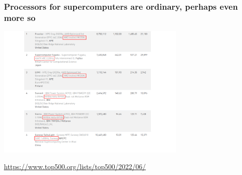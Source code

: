 \documentclass[12pt,dvipdfmx]{beamer}
\begin{document}
\begin{frame}
\frametitle{Processors for supercomputers are ordinary, perhaps even more so}
  \begin{center}
    \includegraphics[width=0.7\textwidth]{out/pdf/svg/top500_2022_june.pdf}

    \url{https://www.top500.org/lists/top500/2022/06/}
  \end{center}
\end{frame}

\end{document}
